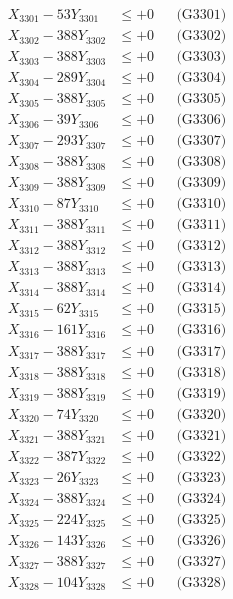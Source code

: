 \documentclass[a4paper,10pt]{article}
\begin{document}
{\begin{align}
\allowbreak
X_{3301} - 53Y_{3301} &\leq +0 && \text{(G3301)} \\
X_{3302} - 388Y_{3302} &\leq +0 && \text{(G3302)} \\
X_{3303} - 388Y_{3303} &\leq +0 && \text{(G3303)} \\
X_{3304} - 289Y_{3304} &\leq +0 && \text{(G3304)} \\
X_{3305} - 388Y_{3305} &\leq +0 && \text{(G3305)} \\
X_{3306} - 39Y_{3306} &\leq +0 && \text{(G3306)} \\
X_{3307} - 293Y_{3307} &\leq +0 && \text{(G3307)} \\
X_{3308} - 388Y_{3308} &\leq +0 && \text{(G3308)} \\
X_{3309} - 388Y_{3309} &\leq +0 && \text{(G3309)} \\
X_{3310} - 87Y_{3310} &\leq +0 && \text{(G3310)} \\
\allowbreak
X_{3311} - 388Y_{3311} &\leq +0 && \text{(G3311)} \\
X_{3312} - 388Y_{3312} &\leq +0 && \text{(G3312)} \\
X_{3313} - 388Y_{3313} &\leq +0 && \text{(G3313)} \\
X_{3314} - 388Y_{3314} &\leq +0 && \text{(G3314)} \\
X_{3315} - 62Y_{3315} &\leq +0 && \text{(G3315)} \\
X_{3316} - 161Y_{3316} &\leq +0 && \text{(G3316)} \\
X_{3317} - 388Y_{3317} &\leq +0 && \text{(G3317)} \\
X_{3318} - 388Y_{3318} &\leq +0 && \text{(G3318)} \\
X_{3319} - 388Y_{3319} &\leq +0 && \text{(G3319)} \\
X_{3320} - 74Y_{3320} &\leq +0 && \text{(G3320)} \\
\allowbreak
X_{3321} - 388Y_{3321} &\leq +0 && \text{(G3321)} \\
X_{3322} - 387Y_{3322} &\leq +0 && \text{(G3322)} \\
X_{3323} - 26Y_{3323} &\leq +0 && \text{(G3323)} \\
X_{3324} - 388Y_{3324} &\leq +0 && \text{(G3324)} \\
X_{3325} - 224Y_{3325} &\leq +0 && \text{(G3325)} \\
X_{3326} - 143Y_{3326} &\leq +0 && \text{(G3326)} \\
X_{3327} - 388Y_{3327} &\leq +0 && \text{(G3327)} \\
X_{3328} - 104Y_{3328} &\leq +0 && \text{(G3328)} \\

\end{align}}
\end{document}
